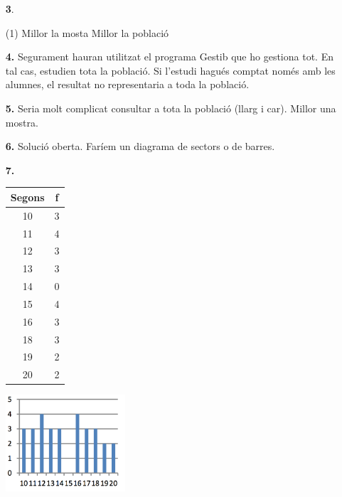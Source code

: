\documentclass[a4paper, pdf, twoside]{book}
\begin{document}
\begin{multicols}{2}
\begin{enumerate}
 \item[\fontfamily{phv}\selectfont\color{blue}\textbf{3}. ] 
 \begin{tasks}[column-sep=1em, item-indent=1.3333em](1)
	 \task Millor la mosta
	 \task Millor la població
\end{tasks}
 \end{enumerate}
\begin{enumerate}
\vspace{0.25cm}
\item[\fontfamily{phv}\selectfont\color{blue}\textbf{4. }] 
Segurament hauran utilitzat el programa Gestib que ho gestiona tot. En tal cas, estudien tota la població. Si l'estudi hagués comptat només amb les alumnes, el resultat no representaria a toda la població.
\vspace{0.25cm}
\item[\fontfamily{phv}\selectfont\color{blue}\textbf{5. }] 
Seria molt complicat consultar a tota la població (llarg i car). Millor una mostra.
\vspace{0.25cm}
\item[\fontfamily{phv}\selectfont\color{blue}\textbf{6. }] 
Solució oberta. Faríem un diagrama de sectors o de barres.
\vspace{0.25cm}
\item[\fontfamily{phv}\selectfont\color{blue}\textbf{7. }] 
 \begin {tabular}{c|c} Segons & f \\ \hline 10 & 3 \\ 11 & 4 \\ 12 & 3 \\ 13 & 3 \\ 14 & 0 \\ 15 & 4 \\ 16 & 3 \\ 18 & 3 \\ 19 & 2 \\ 20 & 2 \\ \end {tabular} \par \includegraphics [width=0.35\textwidth ]{img-sol/t4-7} \par {} 
 \end{enumerate}
\vspace{0.3cm}


\end{multicols}
\end{document}
